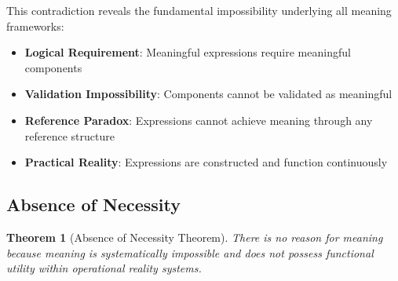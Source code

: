 \documentclass[12pt,a4paper]{article}
\newtheorem{theorem}{Theorem}[section]
\begin{document}
This contradiction reveals the fundamental impossibility underlying all meaning frameworks:

\begin{itemize}
\item \textbf{Logical Requirement}: Meaningful expressions require meaningful components
\item \textbf{Validation Impossibility}: Components cannot be validated as meaningful
\item \textbf{Reference Paradox}: Expressions cannot achieve meaning through any reference structure
\item \textbf{Practical Reality}: Expressions are constructed and function continuously
\end{itemize}

\subsection{Absence of Necessity}

\begin{theorem}[Absence of Necessity Theorem]
There is no reason for meaning because meaning is systematically impossible and does not possess functional utility within operational reality systems.
\end{theorem}
\end{document}
